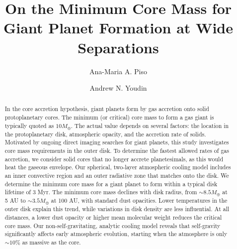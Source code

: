 \documentclass[apj, numberedappendix]{emulateapj}
\begin{document}



\title{On the Minimum Core Mass for Giant Planet Formation at Wide Separations}

\author{Ana-Maria A. Piso}

\author{Andrew N. Youdin}


\begin{abstract}

In the core accretion hypothesis, giant planets form by gas accretion onto solid protoplanetary cores.  The minimum (or critical) core mass to form a gas giant is typically quoted as $10 M_{\oplus}$. The actual value depends on several factors: the location in the protoplanetary disk, atmospheric opacity, and the accretion rate of solids. Motivated by ongoing direct imaging searches for giant planets, this study investigates core mass requirements in the outer disk.  To determine the fastest allowed rates of gas accretion, we consider solid cores that no longer accrete planetesimals, as this would heat the gaseous envelope. Our spherical, two-layer atmospheric cooling model includes an inner convective region and an outer radiative zone that matches onto the disk.  We determine the minimum core mass for a giant planet to form within a typical disk lifetime of 3 Myr.   The minimum core mass declines with disk radius, from $\sim$$8.5 M_{\oplus}$ at 5 AU to $\sim$$3.5 M_{\oplus}$ at 100 AU, with standard dust opacities.  Lower temperatures in the outer disk explain this trend, while variations in disk density are less influential.  At all distances, a lower dust opacity or higher mean molecular weight reduces the critical core mass. Our non-self-gravitating, analytic cooling model reveals that self-gravity significantly affects early atmospheric evolution, starting when the atmosphere is only $\sim$$10\%$ as massive as the core.


\end{abstract}
\end{document}
